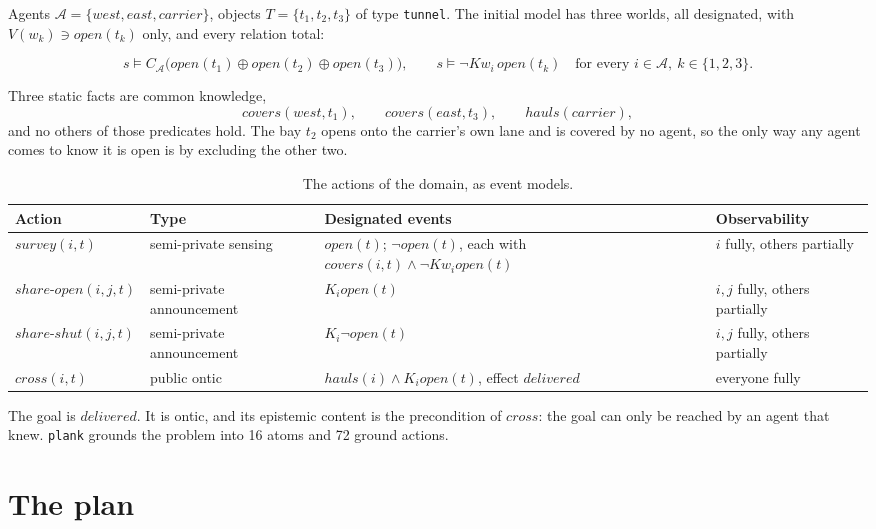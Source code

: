 \documentclass[11pt,a4paper]{article}
\theoremstyle{definition}
\newcommand{\Ag}{\mathcal{A}}
\newcommand{\Kop}[1]{K_{#1}}
\newcommand{\Kw}[1]{\mathit{Kw}_{#1}}
\newcommand{\code}[1]{\texttt{\small #1}}
\newcommand{\ag}[1]{\mathit{#1}}
\newcommand{\op}{\mathit{open}}
\begin{document}
Agents $\Ag = \{\ag{west}, \ag{east}, \ag{carrier}\}$, objects
$T = \{t_1, t_2, t_3\}$ of type \code{tunnel}. The initial model has three
worlds, all designated, with $V(w_k) \ni \op(t_k)$ only, and every relation
total:

\[
  s \models C_{\Ag}\big(\op(t_1) \oplus \op(t_2) \oplus \op(t_3)\big),
  \qquad
  s \models \neg\Kw{i}\,\op(t_k) \quad \text{for every } i \in \Ag,\ k \in \{1,2,3\}.
\]

Three static facts are common knowledge,
\[
  \mathit{covers}(\ag{west}, t_1),\qquad \mathit{covers}(\ag{east}, t_3),\qquad \mathit{hauls}(\ag{carrier}),
\]
and no others of those predicates hold. The bay
$t_2$ opens onto the carrier's own lane and is covered by no agent, so the only
way any agent comes to know it is open is by excluding the other two.

\begin{table}[H]
\centering\small
\caption{The actions of the domain, as event models.}
\label{tab:actions}
\begin{tabularx}{\textwidth}{@{}>{\raggedright}p{2.7cm}>{\raggedright}p{2.6cm}X>{\raggedright\arraybackslash}p{2.9cm}@{}}
\toprule
\textbf{Action} & \textbf{Type} & \textbf{Designated events} & \textbf{Observability} \\
\midrule
$\mathit{survey}(i,t)$ & semi-private sensing
  & $\op(t)$; $\neg\op(t)$, each with $\mathit{covers}(i,t) \wedge \neg\Kw{i}\op(t)$
  & $i$ fully, others partially \\
$\mathit{share\text{-}open}(i,j,t)$ & semi-private announcement
  & $\Kop{i}\op(t)$ & $i,j$ fully, others partially \\
$\mathit{share\text{-}shut}(i,j,t)$ & semi-private announcement
  & $\Kop{i}\neg\op(t)$ & $i,j$ fully, others partially \\
$\mathit{cross}(i,t)$ & public ontic
  & $\mathit{hauls}(i) \wedge \Kop{i}\op(t)$, effect $\mathit{delivered}$
  & everyone fully \\
\bottomrule
\end{tabularx}
\end{table}

The goal is $\mathit{delivered}$. It is ontic, and its epistemic content is
the precondition of $\mathit{cross}$: the goal can only be reached by an agent
that knew. \code{plank} grounds the problem into 16 atoms and 72 ground actions.

\section{The plan}
\label{sec:policy}
\end{document}
